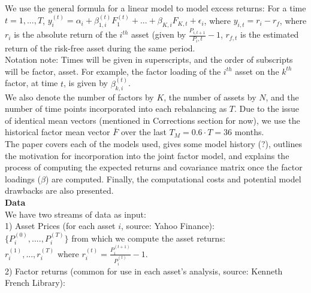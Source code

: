 \documentclass{article}
\begin{document}
\vspace{5mm}

We use the general formula for a linear model to model excess returns: For a time $t = 1,...,T$, $y_{i}^{(t)} = \alpha _i + \beta_{1,i}^{(t)}F^{(t)}_1 + ... + \beta_{K,i}F_{K,t} + \epsilon_i$, where $y_{i,t} = r_i - r_f$, where $r_i$ is the absolute return of the $i^{th}$ asset (given by $\frac{P_{i,t+1}}{P_i,t} - 1$, $r_{f,t}$ is the estimated return of the risk-free asset during the same period.\\

Notation note: Times will be given in superscripts, and the order of subscripts will be factor, asset. For example, the factor loading of the $i^{th}$ asset on the $k^{th}$ factor, at time $t$, is given by $\beta^{(t)}_{k,i}$.\\

We also denote the number of factors by $K$, the number of assets by $N$, and the number of time points incorporated into each rebalancing as $T$. Due to the issue of identical mean vectors (mentioned in Corrections section for now), we use the historical factor mean vector $\bar{F}$ over the last $T_M = 0.6 \cdot T = 36$ months.\\

The paper covers each of the models used, gives some model history (?), outlines the motivation for incorporation into the joint factor model, and explains the process of computing the expected returns and covariance matrix once the factor loadings ($\beta$) are computed. Finally, the computational costs and potential model drawbacks are also presented.\\

\textbf{Data}\\

We have two streams of data as input:\\

1) Asset Prices (for each asset $i$, source: Yahoo Finance):\\

$\{P_i^{(0)}, ...., P_i^{(T)} \}$ from which we compute the asset returns:\\

$r_i^{(1)}, ..., r_i^{(T)}$ where $r_i^{(t)} = \frac{P_i^{(t+1)}}{P_i^{(t)}} - 1$.\\

2) Factor returns (common for use in each asset's analysis, source: Kenneth French Library):\\
\end{document}
